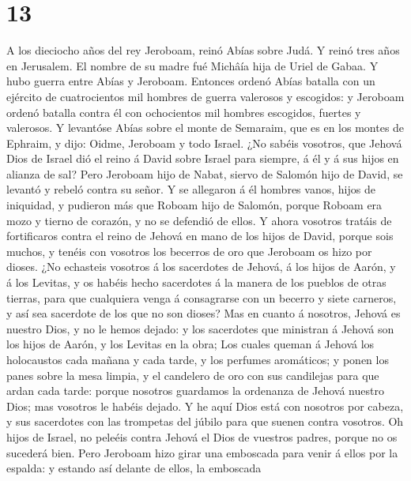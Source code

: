 \hypertarget{section-12}{%
\section{13}\label{section-12}}

 A los dieciocho años del rey Jeroboam, reinó Abías sobre
Judá.  Y reinó tres años en Jerusalem. El nombre de su
madre fué Michâía hija de Uriel de Gabaa. Y hubo guerra entre Abías y
Jeroboam.  Entonces ordenó Abías batalla con un ejército
de cuatrocientos mil hombres de guerra valerosos y escogidos: y Jeroboam
ordenó batalla contra él con ochocientos mil hombres escogidos, fuertes
y valerosos.  Y levantóse Abías sobre el monte de
Semaraim, que es en los montes de Ephraim, y dijo: Oidme, Jeroboam y
todo Israel.  ¿No sabéis vosotros, que Jehová Dios de
Israel dió el reino á David sobre Israel para siempre, á él y á sus
hijos en alianza de sal?  Pero Jeroboam hijo de Nabat,
siervo de Salomón hijo de David, se levantó y rebeló contra su señor.
 Y se allegaron á él hombres vanos, hijos de iniquidad, y
pudieron más que Roboam hijo de Salomón, porque Roboam era mozo y tierno
de corazón, y no se defendió de ellos.  Y ahora vosotros
tratáis de fortificaros contra el reino de Jehová en mano de los hijos
de David, porque sois muchos, y tenéis con vosotros los becerros de oro
que Jeroboam os hizo por dioses.  ¿No echasteis vosotros á
los sacerdotes de Jehová, á los hijos de Aarón, y á los Levitas, y os
habéis hecho sacerdotes á la manera de los pueblos de otras tierras,
para que cualquiera venga á consagrarse con un becerro y siete carneros,
y así sea sacerdote de los que no son dioses?  Mas en
cuanto á nosotros, Jehová es nuestro Dios, y no le hemos dejado: y los
sacerdotes que ministran á Jehová son los hijos de Aarón, y los Levitas
en la obra;  Los cuales queman á Jehová los holocaustos
cada mañana y cada tarde, y los perfumes aromáticos; y ponen los panes
sobre la mesa limpia, y el candelero de oro con sus candilejas para que
ardan cada tarde: porque nosotros guardamos la ordenanza de Jehová
nuestro Dios; mas vosotros le habéis dejado.  Y he aquí
Dios está con nosotros por cabeza, y sus sacerdotes con las trompetas
del júbilo para que suenen contra vosotros. Oh hijos de Israel, no
peleéis contra Jehová el Dios de vuestros padres, porque no os sucederá
bien.  Pero Jeroboam hizo girar una emboscada para venir
á ellos por la espalda: y estando así delante de ellos, la emboscada
